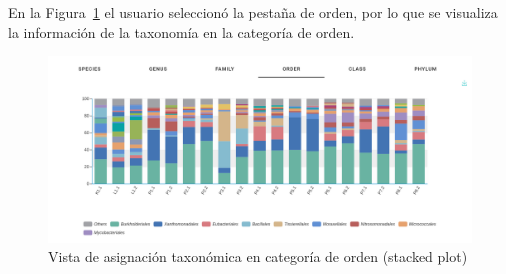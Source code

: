 En la Figura~\ref{fig:app-results-taxonomy-order} el usuario seleccionó la pestaña de orden, por lo que se visualiza la información de la taxonomía en la categoría de orden.
\begin{figure}[H]
    \includegraphics[width=1\linewidth]{images/app/results/taxonomy_order.png}

    \caption{Vista de asignación taxonómica en categoría de orden (stacked plot)}
    \label{fig:app-results-taxonomy-order}
\end{figure}








